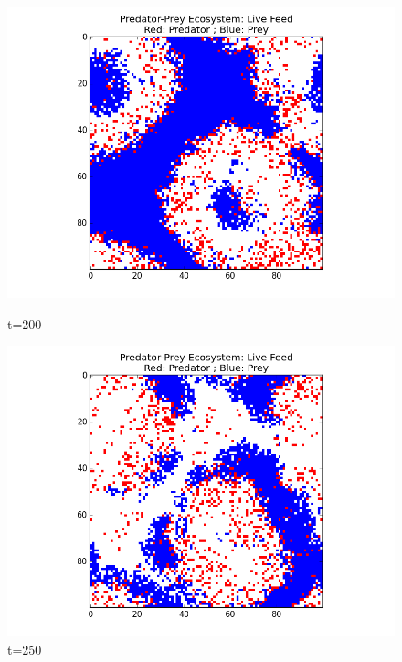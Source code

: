 \documentclass[a4paper,12pt]{article}
\begin{document}
  \begin{figure}[H]
  \centering        
	\begin{minipage}[b]{.45\linewidth}		 
		 \includegraphics[width = 1\linewidth]{./pics/ecosystem_snapshot_200.png} 
                 \caption{t=200}
        \end{minipage}  
        \quad
	\begin{minipage}[b]{.45\linewidth}		
		 \includegraphics[width = 1\linewidth]{./pics/ecosystem_snapshot_250.png} 
                 \caption{t=250}
        \end{minipage}  
  \end{figure}       
\end{document}
